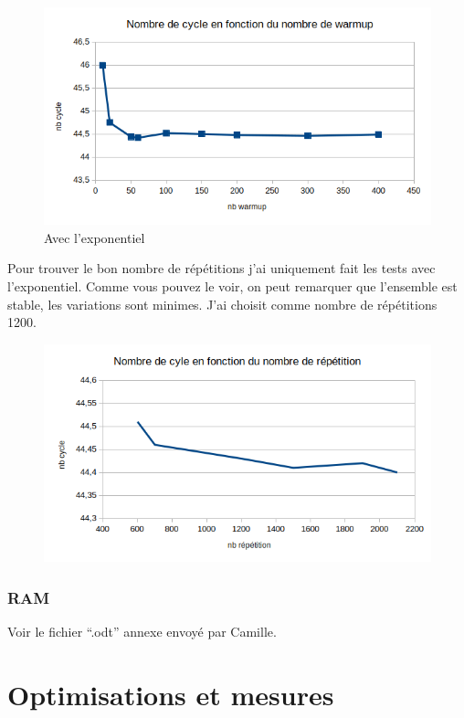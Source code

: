 \documentclass[12pt,a4paper]{article}
\begin{document}
\begin{figure}[h]
    \includegraphics[scale=0.8]{figures/L2/L2warmup2.png}
    \caption{Avec l'exponentiel}
\end{figure}

Pour trouver le bon nombre de répétitions j'ai uniquement fait les tests avec
l'exponentiel. Comme vous pouvez le voir, on peut remarquer que l'ensemble est
stable, les variations sont minimes. J'ai choisit comme nombre de répétitions
1200.
\begin{figure}[h]
    \includegraphics[scale=0.8]{figures/L2/L2repet.png}
    \caption{ }
\end{figure}

\subsubsection{RAM}

Voir le fichier \enquote{.odt} annexe envoyé par Camille.

\section{Optimisations et mesures}
\end{document}
